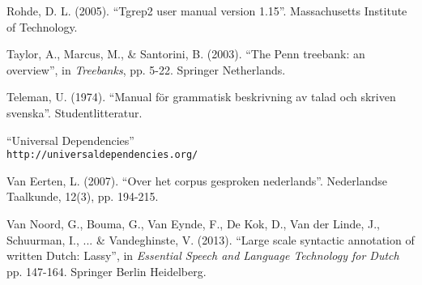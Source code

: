 \documentclass[]{scrartcl}
\theoremstyle{exmp}
\begin{document}
\begin{thebibliography}{20}
Rohde, D. L. (2005). ``Tgrep2 user manual version 1.15''. Massachusetts Institute of Technology.

Taylor, A., Marcus, M., \& Santorini, B. (2003). 
``The Penn treebank: an overview'', in \textit{Treebanks}, pp. 5-22. Springer Netherlands.

Teleman, U. (1974). 
``Manual för grammatisk beskrivning av talad och skriven svenska''.
Studentlitteratur.

``Universal Dependencies'' \\
\texttt{http://universaldependencies.org/}

Van Eerten, L. (2007). ``Over het corpus gesproken nederlands''. Nederlandse Taalkunde, 12(3), pp. 194-215.

Van Noord, G., Bouma, G., Van Eynde, F., De Kok, D., Van der Linde, J., Schuurman, I., ... \& Vandeghinste, V. (2013). ``Large scale syntactic annotation of written Dutch: Lassy'', in \textit{Essential Speech and Language Technology for Dutch} pp. 147-164. Springer Berlin Heidelberg.



\end{thebibliography}
\end{document}
